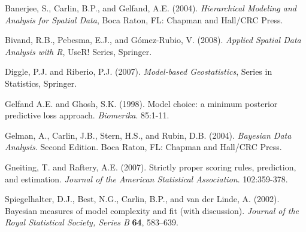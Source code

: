 \documentclass{article}
\begin{document}
\begin{description}

\item Banerjee, S., Carlin, B.P., and Gelfand, A.E. (2004). \emph{Hierarchical Modeling and Analysis for Spatial Data}, Boca Raton, FL: Chapman and Hall/CRC Press.

\item Bivand, R.B., Pebesma, E.J.,  and G\'{o}mez-Rubio, V. (2008). \emph{Applied Spatial Data Analysis with R}, UseR! Series, Springer.

\item Diggle, P.J. and Riberio, P.J. (2007). \emph{Model-based Geostatistics}, Series in Statistics, Springer.

\item Gelfand A.E. and Ghosh, S.K. (1998). Model choice: a minimum posterior predictive loss approach. \emph{Biomerika}. 85:1-11.   
  
\item Gelman, A., Carlin, J.B., Stern, H.S., and Rubin, D.B. (2004). \emph{Bayesian Data Analysis}. Second Edition. Boca Raton, FL: Chapman and Hall/CRC Press.
  
\item Gneiting, T. and Raftery, A.E. (2007). Strictly proper scoring rules, prediction, and estimation. \emph{Journal of the American Statistical Association}. 102:359-378. 
  
\item Spiegelhalter, D.J., Best, N.G., Carlin, B.P., and van der Linde, A. (2002). Bayesian measures of model complexity and fit (with discussion). \emph{Journal of the Royal Statistical Society, Series B} \textbf{64}, 583--639.
  
\end{description}
 
\end{document}
